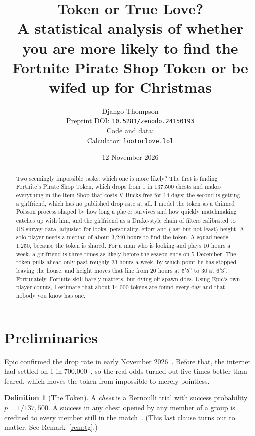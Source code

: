 \documentclass[11pt]{article}
\title{\textbf{Token or True Love?}\\[4pt] \large A statistical analysis of whether you are more likely to find the Fortnite Pirate Shop Token or be wifed up for Christmas}
\author{Django Thompson\\[2pt] \small Preprint DOI: \href{https://doi.org/10.5281/zenodo.24150193}{\texttt{10.5281/zenodo.24150193}}\\ \small Code and data: \texttt{\repourl}\\ \small Calculator: \texttt{lootorlove.lol}}
\date{12 November 2026}
\theoremstyle{definition}
\newtheorem{definition}{Definition}[section]
\theoremstyle{plain}
\begin{document}
\maketitle

\begin{abstract}
\noindent
Two seemingly impossible tasks: which one is more likely? The first is finding Fortnite's Pirate Shop Token, which drops from 1 in 137{,}500 chests and makes everything in the Item Shop that costs V-Bucks free for 14 days; the second is getting a girlfriend, which has no published drop rate at all. I model the token as a thinned Poisson process shaped by how long a player survives and how quickly matchmaking catches up with him, and the girlfriend as a Drake-style chain of filters calibrated to US survey data, adjusted for looks, personality, effort and (last but not least) height. A solo player needs a median of about 3{,}240 hours to find the token. A squad needs 1{,}250, because the token is shared. For a man who is looking and plays 10 hours a week, a girlfriend is three times as likely before the season ends on 5 December. The token pulls ahead only past roughly 23 hours a week, by which point he has stopped leaving the house, and height moves that line from 20 hours at 5'5'' to 30 at 6'3''. Fortunately, Fortnite skill barely matters, but dying off spawn does. Using Epic's own player counts, I estimate that about 14{,}000 tokens are found every day and that nobody you know has one.
\end{abstract}


\section{Preliminaries}

Epic confirmed the drop rate in early November 2026~\cite{status,vgc}. Before that, the internet had settled on 1 in 700{,}000~\cite{timesaver}, so the real odds turned out five times better than feared, which moves the token from impossible to merely pointless.

\begin{definition}[The Token]
A \emph{chest} is a Bernoulli trial with success probability $p = 1/137{,}500$. A success in any chest opened by any member of a group is credited to every member still in the match~\cite{gamesradar}. (This last clause turns out to matter. See Remark~\ref{rem:tg}.)
\end{definition}
\end{document}
